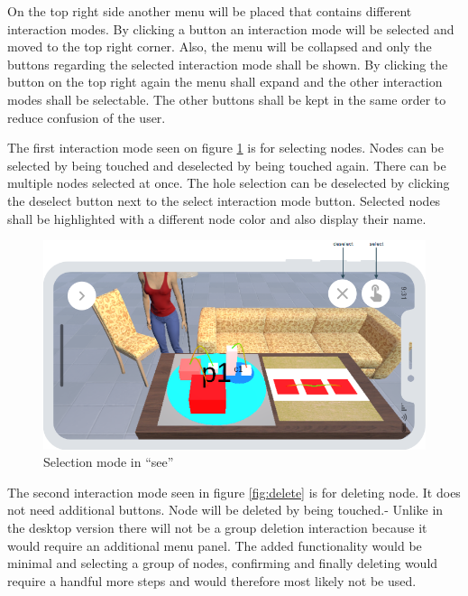 On the top right side another menu will be placed that contains different interaction modes.
By clicking a button an interaction mode will be selected and moved to the top right corner.
Also, the menu will be collapsed and only the buttons regarding the selected interaction mode shall be shown.
By clicking the button on the top right again the menu shall expand and the other interaction modes shall be selectable.
The other buttons shall be kept in the same order to reduce confusion of the user.

The first interaction mode seen on figure \ref{fig:select} is for selecting nodes.
Nodes can be selected by being touched and deselected by being touched again.
There can be multiple nodes selected at once.
The hole selection can be deselected by clicking the deselect button next to the select interaction mode button.
Selected nodes shall be highlighted with a different node color and also display their name.

\begin{figure}[htb]
    \centering
    \includegraphics[width=1\textwidth]{Concept/img/menu1.png}
    \caption{Selection mode in \enquote{\gls{see}}}\label{fig:select}
\end{figure}

The second interaction mode seen in figure \ref{fig:delete} is for deleting node.
It does not need additional buttons.
Node will be deleted by being touched.-
Unlike in the desktop version there will not be a group deletion interaction because it would require an additional menu panel.
The added functionality would be minimal and selecting a group of nodes, confirming and finally deleting would require a handful more steps and would therefore most likely not be used.

